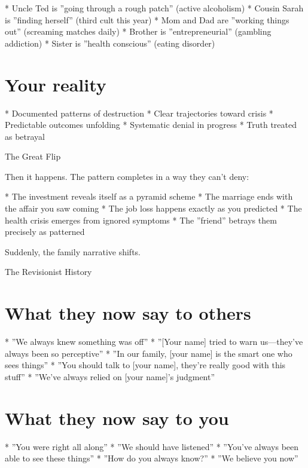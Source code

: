 \documentclass[12pt,oneside]{book}
\begin{document}
                    * Uncle Ted is ''going through a rough patch'' (active alcoholism)
                    * Cousin Sarah is ''finding herself'' (third cult this year)
                    * Mom and Dad are ''working things out'' (screaming matches daily)
                    * Brother is ''entrepreneurial'' (gambling addiction)
                    * Sister is ''health conscious'' (eating disorder)

\section{Your reality}

                    * Documented patterns of destruction
                    * Clear trajectories toward crisis
                    * Predictable outcomes unfolding
                    * Systematic denial in progress
                    * Truth treated as betrayal

The Great Flip

Then it happens. The pattern completes in a way they can't deny:

                    * The investment reveals itself as a pyramid scheme
                    * The marriage ends with the affair you saw coming
                    * The job loss happens exactly as you predicted
                    * The health crisis emerges from ignored symptoms
                    * The ''friend'' betrays them precisely as patterned

Suddenly, the family narrative shifts.

The Revisionist History

\section{What they now say to others}

                    * ''We always knew something was off''
                    * ''[Your name] tried to warn us---they've always been so perceptive''
                    * ''In our family, [your name] is the smart one who sees things''
                    * ''You should talk to [your name], they're really good with this stuff''
                    * ''We've always relied on [your name]'s judgment''

\section{What they now say to you}

                    * ''You were right all along''
                    * ''We should have listened''
                    * ''You've always been able to see these things''
                    * ''How do you always know?''
                    * ''We believe you now''
\end{document}
